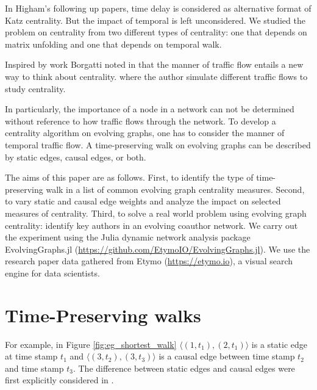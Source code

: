 \documentclass[12pt]{article}
\theoremstyle{definition}
\begin{document}
In Higham's following up papers, time delay is considered as alternative format of Katz centrality.
But the impact of temporal is left unconsidered. We studied the problem on centrality from two different types of centrality: one that depends on matrix unfolding and one that depends on temporal walk.


Inspired by work
Borgatti noted in \cite{borgatti05} that the manner of traffic flow entails a new way to think about centrality.
where the author simulate different traffic flows to study centrality.

In particularly, the importance of a node in a network can not be determined without reference to how traffic flows through the network.
To develop a centrality algorithm on evolving graphs, one has to consider the manner of temporal traffic flow.
A time-preserving walk on evolving graphs can be described by static edges, causal edges, or both.





The aims of this paper are as follows. First, to identify the type of time-preserving walk in a list of common evolving graph centrality measures. Second, to vary static and causal edge weights and analyze the impact on selected measures of centrality.
Third, to solve a real world problem using evolving graph centrality: identify key authors in an evolving coauthor network.
We carry out the experiment using the Julia dynamic network analysis package
EvolvingGraphs.jl (\url{https://github.com/EtymoIO/EvolvingGraphs.jl}).
We use the research paper data gathered from Etymo (\url{https://etymo.io}), a visual search engine for data scientists.



\section{Time-Preserving walks}
\label{sec:time-pres-walks}

For example, in Figure \ref{fig:eg_shortest_walk}
$\langle (1, t_1), (2, t_1) \rangle$ is a static edge at time stamp $t_1$ and $\langle (3, t_2), (3, t_3) \rangle$ is a causal edge between time stamp $t_2$ and time stamp $t_3$.
The difference between static edges and causal edges were first explicitly considered in \cite{chen16}.
\end{document}
